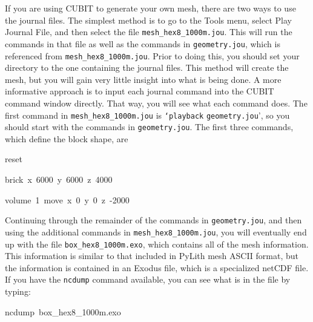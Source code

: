 If you are using CUBIT to generate your own mesh, there are two ways
to use the journal files. The simplest method is to go to the\textsf{
Tools} menu, select \textsf{Play Journal File}, and then select the
file \texttt{mesh\_hex8\_1000m.jou}. This will run the commands in
that file as well as the commands in \texttt{geometry.jou}, which
is referenced from \texttt{mesh\_hex8\_1000m.jou}. Prior to doing
this, you should set your directory to the one containing the journal
files. This method will create the mesh, but you will gain very little
insight into what is being done. A more informative approach is to
input each journal command into the CUBIT command window directly.
That way, you will see what each command does. The first command in
\texttt{mesh\_hex8\_1000m.jou} is \texttt{`playback} \texttt{geometry.jou}',
so you should start with the commands in \texttt{geometry.jou}. The
first three commands, which define the block shape, are
\begin{lyxcode}
reset

brick~x~6000~y~6000~z~4000

volume~1~move~x~0~y~0~z~-2000
\end{lyxcode}
Continuing through the remainder of the commands in \texttt{geometry.jou},
and then using the additional commands in \texttt{mesh\_hex8\_1000m.jou},
you will eventually end up with the file \texttt{box\_hex8\_1000m.exo},
which contains all of the mesh information. This information is similar
to that included in PyLith mesh ASCII format, but the information
is contained in an Exodus file, which is a specialized netCDF file.
If you have the \texttt{ncdump} command available, you can see what
is in the file by typing:
\begin{lyxcode}
ncdump~box\_hex8\_1000m.exo
\end{lyxcode}
